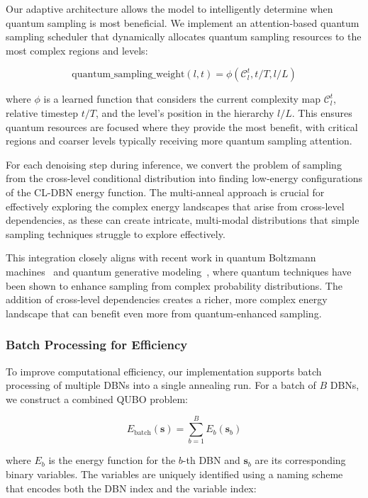\documentclass[10pt,twocolumn,letterpaper]{article}
\newcommand{\bm}[1]{\boldsymbol{#1}}
\begin{document}
Our adaptive architecture allows the model to intelligently determine when quantum sampling is most beneficial. We implement an attention-based quantum sampling scheduler that dynamically allocates quantum sampling resources to the most complex regions and levels:

\begin{equation}
\text{quantum\_sampling\_weight}(l,t) = \phi(\mathcal{C}_l^t, t/T, l/L)
\end{equation}

where $\phi$ is a learned function that considers the current complexity map $\mathcal{C}_l^t$, relative timestep $t/T$, and the level's position in the hierarchy $l/L$. This ensures quantum resources are focused where they provide the most benefit, with critical regions and coarser levels typically receiving more quantum sampling attention.

For each denoising step during inference, we convert the problem of sampling from the cross-level conditional distribution into finding low-energy configurations of the CL-DBN energy function. The multi-anneal approach is crucial for effectively exploring the complex energy landscapes that arise from cross-level dependencies, as these can create intricate, multi-modal distributions that simple sampling techniques struggle to explore effectively.

This integration closely aligns with recent work in quantum Boltzmann machines~\cite{amin2018quantum} and quantum generative modeling~\cite{benedetti2024quantum}, where quantum techniques have been shown to enhance sampling from complex probability distributions. The addition of cross-level dependencies creates a richer, more complex energy landscape that can benefit even more from quantum-enhanced sampling.

\subsubsection{Batch Processing for Efficiency}

To improve computational efficiency, our implementation supports batch processing of multiple DBNs into a single annealing run. For a batch of $B$ DBNs, we construct a combined QUBO problem:

\begin{equation}
E_{\text{batch}}(\bm{s}) = \sum_{b=1}^{B} E_b(\bm{s}_b)
\end{equation}

where $E_b$ is the energy function for the $b$-th DBN and $\bm{s}_b$ are its corresponding binary variables. The variables are uniquely identified using a naming scheme that encodes both the DBN index and the variable index:
\end{document}
